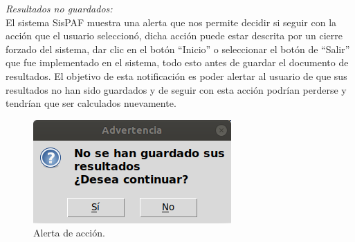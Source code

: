 \noindent \textit{Resultados no guardados:}\\

\noindent El sistema SisPAF muestra una alerta que nos permite decidir si seguir con la acción que el usuario seleccionó, dicha acción puede estar descrita por un cierre forzado del sistema, dar clic en el botón “Inicio” o seleccionar el botón de “Salir” que fue implementado en el sistema, todo esto antes de guardar el documento de resultados. El objetivo de esta notificación es poder alertar al usuario de que sus resultados no han sido guardados y de seguir con esta acción podrían perderse y tendrían que ser calculados nuevamente.

\begin{figure}[H]
    \centering
    \includegraphics[scale=0.85]{Capitulo4/Documentos/imagenes_generacion/manual_4.png}
    \caption{Alerta de acción.}
    \label{resultados_guard}
\end{figure}
